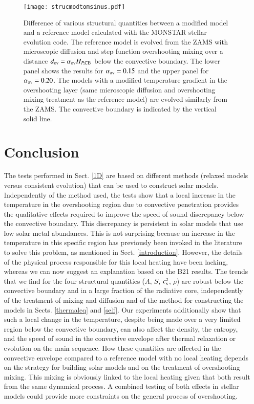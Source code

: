\documentclass[traditabstract]{aa}
\newcommand{\3}{\ss}
\begin{document}
{ \begin{figure}[h!]
\texttt{[image: strucmodtomsinus.pdf]}
   \caption{Difference of various structural quantities between a modified model and a reference model calculated with the MONSTAR stellar evolution code. The reference model is evolved from the ZAMS with microscopic diffusion and step function overshooting mixing over a distance $d_{\rm ov}= \alpha_{\rm ov} H_{P,{\rm CB}}$ below the convective boundary. {The lower panel shows the results for  $\alpha_{\rm ov}=0.15$ and the upper panel for $\alpha_{\rm ov}=0.20$.} The models with a modified temperature gradient in the overshooting layer (same microscopic diffusion and overshooting mixing treatment as the reference model)  are evolved similarly from the ZAMS. The convective boundary is indicated by the vertical solid line.}
 \label{monstar_fig}
\end{figure}

\section{Conclusion}
\label{conclusion}
The tests performed in Sect. \ref{1D} are based on different methods (relaxed models versus consistent evolution) that can be used to construct solar models. Independently of the method used, the tests show
 that a local increase in the temperature in the overshooting region due to convective penetration provides the qualitative effects  required to improve the speed of sound discrepancy below the convective boundary. This discrepancy is persistent in solar models that use low solar metal abundances.  This is not surprising because 
an increase in the temperature in this specific region has previously been invoked in the literature to solve this problem, as mentioned in Sect. \ref{introduction}. However, the details of the physical process responsible for this local heating have been lacking, whereas we can now suggest an explanation based on the B21 results. The trends that we find for the four structural quantities ($A$, $S$, $c_{\rm s}^2$, $\rho$) are robust below the convective boundary and in a large fraction of the radiative core, independently of the treatment of mixing and diffusion and of the method for constructing the models in Sects. \ref{thermaleq} and \ref{self}.
Our experiments additionally show that such a local change in the temperature, despite being made over a very limited region below the convective boundary, can also affect the density, the entropy, and the speed of sound in the convective envelope after thermal relaxation or evolution on the main sequence. 
How these quantities are affected in the convective envelope compared to  a reference model with no local heating 
depends on the strategy for building solar models and on the treatment of overshooting mixing. This mixing is obviously  linked to the
local heating given that both result from the same dynamical process. A combined testing of both effects in stellar models could provide more constraints on the general process of overshooting.  

}
\end{document}
